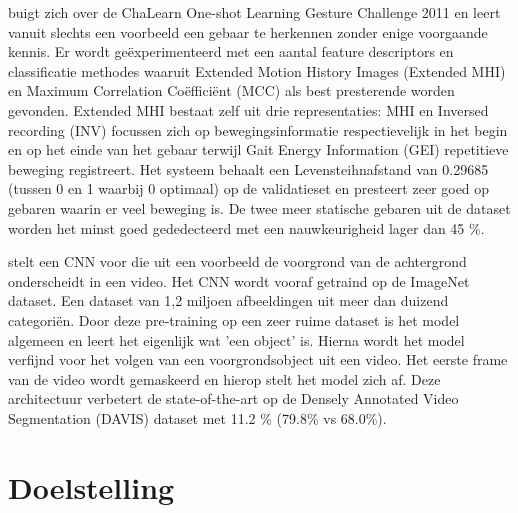 \npar \cite{oneshot-gesture-rgbd} buigt zich over de ChaLearn One-shot Learning Gesture Challenge 2011 en leert vanuit slechts een voorbeeld een gebaar te herkennen zonder enige voorgaande kennis. Er wordt ge\"experimenteerd met een aantal feature descriptors en classificatie methodes waaruit Extended Motion History Images (Extended MHI) en Maximum Correlation Co\"effici\"ent (MCC) als best presterende worden gevonden. Extended MHI  bestaat zelf uit drie representaties: MHI en Inversed recording (INV) focussen zich op bewegingsinformatie respectievelijk in het begin en op het einde van het gebaar terwijl Gait Energy Information (GEI) repetitieve beweging registreert. Het systeem behaalt een Levensteihnafstand van 0.29685 (tussen 0 en 1 waarbij 0 optimaal) op de validatieset en presteert zeer goed op gebaren waarin er veel beweging is. De twee meer statische gebaren uit de dataset worden het minst goed gededecteerd met een nauwkeurigheid lager dan 45 \%.

\npar \cite{oneshot-video-segm} stelt een CNN voor die uit een voorbeeld de voorgrond van de achtergrond onderscheidt in een video. Het CNN wordt vooraf getraind op de ImageNet dataset. Een dataset van 1,2 miljoen afbeeldingen uit meer dan duizend categori\"en. Door deze pre-training op een zeer ruime dataset is het model algemeen en leert het eigenlijk wat 'een object' is. Hierna wordt het model verfijnd voor het volgen van een voorgrondsobject uit een video. Het eerste frame van de video wordt gemaskeerd en hierop stelt het model zich af. Deze architectuur verbetert de state-of-the-art op de Densely Annotated Video Segmentation (DAVIS) dataset met 11.2 \% (79.8\% vs 68.0\%).

\section{Doelstelling}







 